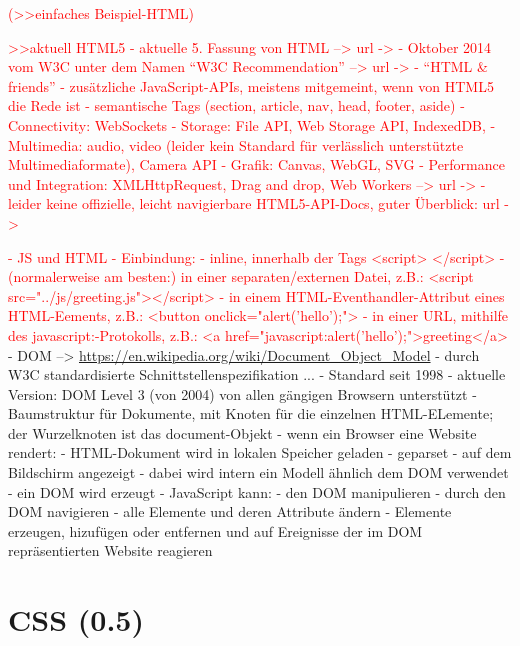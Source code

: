 \documentclass[a4paper, 12pt, hidelinks, listof=totoc, listoftables=totoc, bibliography=totoc]{scrreprt}
\newcommand{\TODO}[1]{\textcolor{red}{#1}\newline}
\begin{document}
\TODO{(>>einfaches Beispiel-HTML)}

\TODO{>>aktuell HTML5}
\TODO{	- aktuelle 5. Fassung von HTML  -->  url -> %
	}
\TODO{	- Oktober 2014 vom W3C unter dem Namen "`W3C Recommendation"'  -->  url -> %
}
\TODO{	- "`HTML \& friends"' - zusätzliche JavaScript-APIs, meistens mitgemeint, wenn von HTML5 die Rede ist
		- semantische Tags (section, article, nav, head, footer, aside)
		- Connectivity: WebSockets
		- Storage: File API, Web Storage API, IndexedDB, 
		- Multimedia: audio, video (leider kein Standard für verlässlich unterstützte Multimediaformate), Camera API
		- Grafik: Canvas, WebGL, SVG
		- Performance und Integration: XMLHttpRequest, Drag and drop, Web Workers}
\TODO{	-->  url -> %
}
\TODO{	- leider keine offizielle, leicht navigierbare HTML5-API-Docs, guter Überblick: url -> %
}

\TODO{- JS und HTML
	- Einbindung:
		- inline, innerhalb der Tags <script> </script>
		- (normalerweise am besten:) in einer separaten/externen Datei, z.B.: <script src="../js/greeting.js"></script>
		- in einem HTML-Eventhandler-Attribut eines HTML-Eements, z.B.: <button onclick="alert('hello');">
		- in einer URL, mithilfe des javascript:-Protokolls, z.B.: <a href="javascript:alert('hello');">greeting</a>
}
- \ac{DOM}  --> \url{https://en.wikipedia.org/wiki/Document_Object_Model}
	- durch W3C standardisierte Schnittstellenspezifikation ...
	- Standard seit 1998
	- aktuelle Version: \ac{DOM} Level 3 (von 2004) von allen gängigen Browsern unterstützt
	- Baumstruktur für Dokumente, mit Knoten für die einzelnen \ac{HTML}-ELemente; der Wurzelknoten ist das document-Objekt
	- wenn ein Browser eine Website rendert:
		- HTML-Dokument wird in lokalen Speicher geladen
		- geparset
		- auf dem Bildschirm angezeigt
		- dabei wird intern ein Modell ähnlich dem \ac{DOM} verwendet
		- ein \ac{DOM} wird erzeugt
	- JavaScript kann:
		- den \ac{DOM} manipulieren
		- durch den \ac{DOM} navigieren
		- alle Elemente und deren Attribute ändern
		- Elemente erzeugen, hizufügen oder entfernen und auf Ereignisse der im \ac{DOM} repräsentierten Website reagieren



\section{CSS (0.5)}
\end{document}
